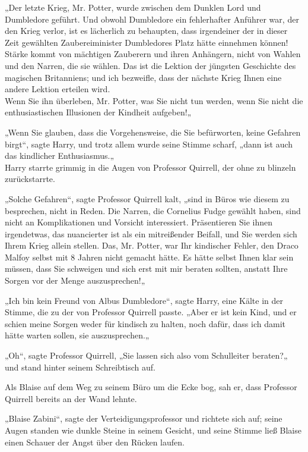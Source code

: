{„Der letzte Krieg, Mr. Potter, wurde zwischen dem Dunklen Lord und Dumbledore geführt. Und obwohl Dumbledore ein fehlerhafter Anführer war, der den Krieg verlor, ist es lächerlich zu behaupten, dass irgendeiner der in dieser Zeit gewählten Zaubereiminister Dumbledores Platz hätte einnehmen können! Stärke kommt von mächtigen Zauberern und ihren Anhängern, nicht von Wahlen und den Narren, die sie wählen. Das ist die Lektion der jüngsten Geschichte des magischen Britanniens; und ich bezweifle, dass der nächste Krieg Ihnen eine andere Lektion erteilen wird.\\ Wenn Sie ihn überleben, Mr. Potter, was Sie nicht tun werden, wenn Sie nicht die enthusiastischen Illusionen der Kindheit aufgeben!„

„Wenn Sie glauben, dass die Vorgehensweise, die Sie befürworten, keine Gefahren birgt“, sagte Harry, und trotz allem wurde seine Stimme scharf, „dann ist auch das kindlicher Enthusiasmus.„\\ Harry starrte grimmig in die Augen von Professor Quirrell, der ohne zu blinzeln zurückstarrte.

„Solche Gefahren“, sagte Professor Quirrell kalt, „sind in Büros wie diesem zu besprechen, nicht in Reden. Die Narren, die Cornelius Fudge gewählt haben, sind nicht an Komplikationen und Vorsicht interessiert. Präsentieren Sie ihnen irgendetwas, das nuancierter ist als ein mitreißender Beifall, und Sie werden sich Ihrem Krieg allein stellen. Das, Mr. Potter, war Ihr kindischer Fehler, den Draco Malfoy selbst mit 8 Jahren nicht gemacht hätte. Es hätte selbst Ihnen klar sein müssen, dass Sie schweigen und sich erst mit mir beraten sollten, anstatt Ihre Sorgen vor der Menge auszusprechen!„

„Ich bin kein Freund von Albus Dumbledore“, sagte Harry, eine Kälte in der Stimme, die zu der von Professor Quirrell passte. „Aber er ist kein Kind, und er schien meine Sorgen weder für kindisch zu halten, noch dafür, dass ich damit hätte warten sollen, sie auszusprechen.„

„Oh“, sagte Professor Quirrell, „Sie lassen sich also vom Schulleiter beraten?„\\ und stand hinter seinem Schreibtisch auf.

Als Blaise auf dem Weg zu seinem Büro um die Ecke bog, sah er, dass Professor Quirrell bereits an der Wand lehnte.

„Blaise Zabini“, sagte der Verteidigungsprofessor und richtete sich auf; seine Augen standen wie dunkle Steine in seinem Gesicht, und seine Stimme ließ Blaise einen Schauer der Angst über den Rücken laufen.

}
